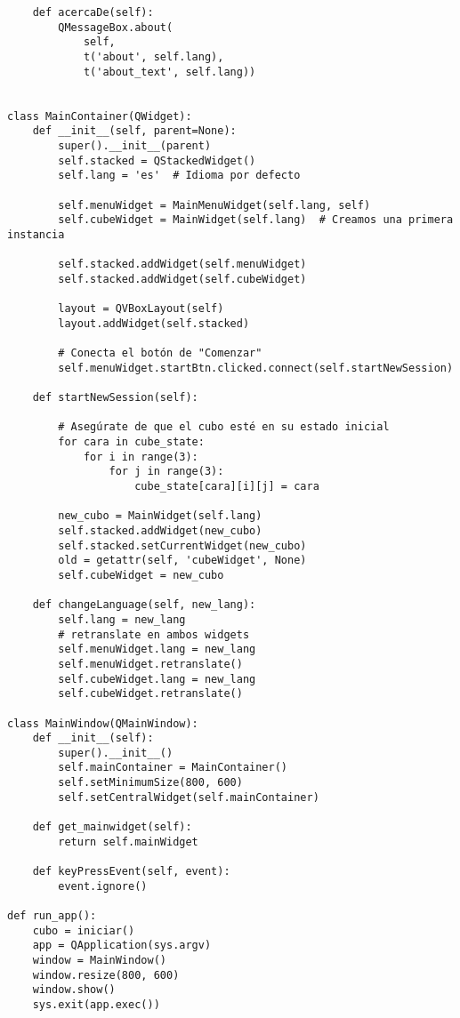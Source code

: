 \begin{lstlisting}
    def acercaDe(self):
        QMessageBox.about(
            self,
            t('about', self.lang),
            t('about_text', self.lang))


class MainContainer(QWidget):
    def __init__(self, parent=None):
        super().__init__(parent)
        self.stacked = QStackedWidget()
        self.lang = 'es'  # Idioma por defecto

        self.menuWidget = MainMenuWidget(self.lang, self)
        self.cubeWidget = MainWidget(self.lang)  # Creamos una primera instancia
        
        self.stacked.addWidget(self.menuWidget)
        self.stacked.addWidget(self.cubeWidget)

        layout = QVBoxLayout(self)
        layout.addWidget(self.stacked)

        # Conecta el botón de "Comenzar"
        self.menuWidget.startBtn.clicked.connect(self.startNewSession)

    def startNewSession(self):
        
        # Asegúrate de que el cubo esté en su estado inicial
        for cara in cube_state:
            for i in range(3):
                for j in range(3):
                    cube_state[cara][i][j] = cara
        
        new_cubo = MainWidget(self.lang)  
        self.stacked.addWidget(new_cubo)  
        self.stacked.setCurrentWidget(new_cubo)
        old = getattr(self, 'cubeWidget', None)
        self.cubeWidget = new_cubo  
    
    def changeLanguage(self, new_lang):
        self.lang = new_lang
        # retranslate en ambos widgets
        self.menuWidget.lang = new_lang
        self.menuWidget.retranslate()
        self.cubeWidget.lang = new_lang
        self.cubeWidget.retranslate()

class MainWindow(QMainWindow):
    def __init__(self):
        super().__init__()
        self.mainContainer = MainContainer()
        self.setMinimumSize(800, 600)
        self.setCentralWidget(self.mainContainer)
    
    def get_mainwidget(self):
        return self.mainWidget
    
    def keyPressEvent(self, event):
        event.ignore()
        
def run_app():
    cubo = iniciar()
    app = QApplication(sys.argv)
    window = MainWindow()
    window.resize(800, 600)
    window.show()
    sys.exit(app.exec())



\end{lstlisting}